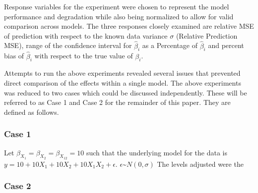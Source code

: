 \documentclass[../../paper.tex]{subfiles}
\begin{document}
Response variables for the experiment were chosen to represent the model performance
and degradation while also being normalized to allow for valid comparison across
models. The three responses closely examined are relative MSE of prediction
with respect to the known data variance $\sigma$ (Relative Prediction MSE), range of the confidence interval for $\hat{\beta}_{i}$ as a Percentage of $\hat{\beta}_{i}$
and percent bias of $\hat{\beta}_{i}$ with respect to the true value of $\beta_{i}$.

Attempts to run the above experiments revealed several issues that prevented direct comparison of the effects within a single model.
The above experiments was reduced to two cases which could be discussed independently. These will be referred to as Case 1 and Case 2 for the remainder of this paper. They are defined as follows.

\subsubsection{Case 1}
Let $\beta_{ X_{1}} = \beta_{ X_{2}} = \beta_{ X_{12}} = 10$ such that the underlying model for the data is $y = 10 + 10X_{1} + 10X_{2} + 10X_{1}X_{2} + \epsilon $.
$\epsilon \text{\textasciitilde} N(0, \sigma)$ The levels adjusted were the 


\subsubsection{Case 2}

\end{document}
